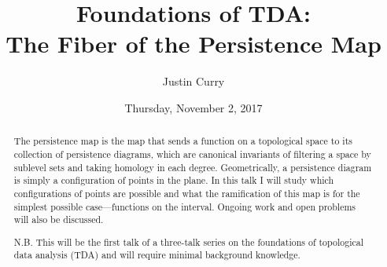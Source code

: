 \documentclass{UAmathtalk}
\author{Justin Curry}
\title{Foundations of TDA:\\The Fiber of the Persistence Map}
\date{Thursday, November 2, 2017}
\begin{document}
\maketitle

\begin{abstract}
The persistence map is the map that sends a function on a topological space to its collection of persistence diagrams, which are canonical invariants of filtering a space by sublevel sets and taking homology in each degree. Geometrically, a persistence diagram is simply a configuration of points in the plane. In this talk I will study which configurations of points are possible and what the ramification of this map is for the simplest possible case---functions on the interval. Ongoing work and open problems will also be discussed.
\bigskip

\noindent N.B. This will be the first talk of a three-talk series on the foundations of topological data analysis (TDA) and will require minimal background knowledge.
\end{abstract}
\end{document}
